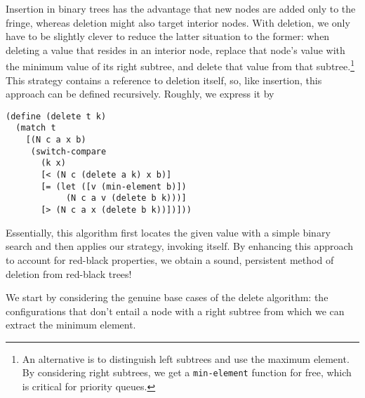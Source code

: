 \documentclass[preprint]{sigplanconf}
\begin{document}
Insertion in binary trees has the advantage that new nodes are added only to the fringe, whereas deletion might also target interior nodes. With deletion, we only have to be slightly clever to reduce the latter situation to the former: when deleting a value that resides in an interior node, replace that node's value with the minimum value of its right subtree, and delete that value from that subtree.\footnote{An alternative is to distinguish left subtrees and use the maximum element. By considering right subtrees, we get a \texttt{min-element} function for free, which is critical for priority queues.} This strategy contains a reference to deletion itself, so, like insertion, this approach can be defined recursively. Roughly, we express it by
\begin{verbatim}
(define (delete t k)
  (match t
    [(N c a x b)
     (switch-compare
       (k x)
       [< (N c (delete a k) x b)]
       [= (let ([v (min-element b)])
            (N c a v (delete b k)))]
       [> (N c a x (delete b k))])]))
\end{verbatim}
Essentially, this algorithm first locates the given value with a simple binary search and then applies our strategy, invoking itself. By enhancing this approach to account for red-black properties, we obtain a sound, persistent method of deletion from red-black trees!

We start by considering the genuine base cases of the delete algorithm: the configurations that don't entail a node with a right subtree from which we can extract the minimum element.
\end{document}
